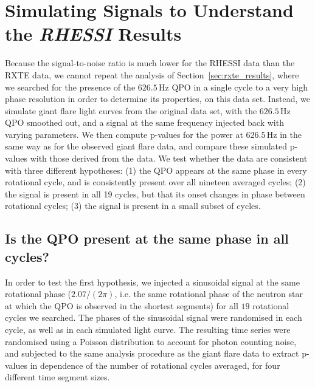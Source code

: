 \documentclass{emulateapj}
\begin{document}
\section{Simulating Signals to Understand the {\it RHESSI} Results}

Because the signal-to-noise ratio is much lower for the RHESSI data than the RXTE data, we cannot repeat the analysis of Section \ref{sec:rxte_results}, where we searched for the presence of the $626.5 \, \mathrm{Hz}$ QPO in a single cycle to a very high phase resolution in order to determine its properties, on this data set. Instead, we simulate giant flare light curves from the original data set, with the $626.5 \, \mathrm{Hz}$ QPO smoothed out, and a signal at the same frequency injected back with varying parameters. We then compute p-values for the power at $626.5 \, \mathrm{Hz}$ in the same way as for the observed giant flare data, and compare these simulated p-values with those derived from the data. We test whether the data are consistent with three different hypotheses: (1) the QPO appears at the same phase in every rotational cycle, and is consistently present over all nineteen averaged cycles; (2) the signal is present in all 19 cycles, but that its onset changes in phase between rotational cycles; (3) the signal is present in a small subset of cycles.

\subsection{Is the QPO present at the same phase in all cycles?}

In order to test the first hypothesis, we injected a sinusoidal signal at the same rotational phase ($2.07/(2\pi)$, i.e. the same rotational phase of the neutron star at which the QPO is observed in the shortest segments) for all $19$ rotational cycles we searched. The phases of the sinusoidal signal were randomised in each cycle, as well as in each simulated light curve. The resulting time series were randomised using a Poisson distribution to account for photon counting noise, and subjected to the same analysis procedure as the giant flare data to extract p-values in dependence of the number of rotational cycles averaged, for four different time segment sizes.
\end{document}
